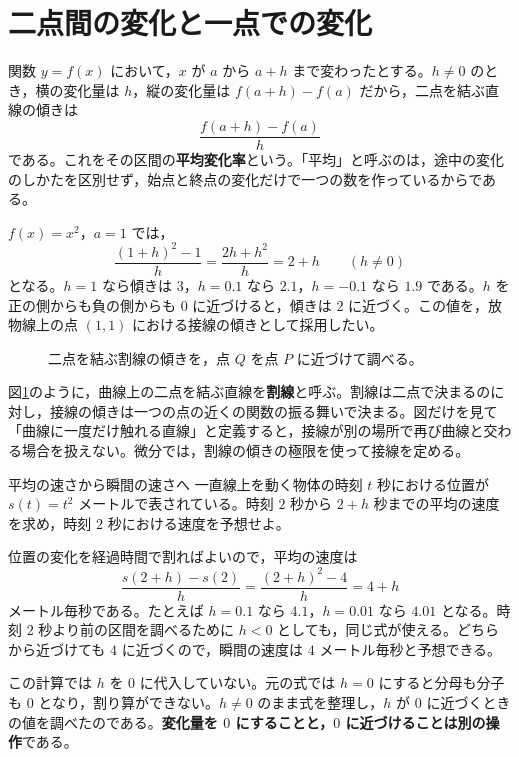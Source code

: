 \section{二点間の変化と一点での変化}\label{節:導入変化}
関数 $y=f(x)$ において，$x$ が $a$ から $a+h$ まで変わったとする。$h\ne0$ のとき，横の変化量は $h$，縦の変化量は $f(a+h)-f(a)$ だから，二点を結ぶ直線の傾きは
\[
 \frac{f(a+h)-f(a)}{h}
\]
である。これをその区間の\textbf{平均変化率}という。「平均」と呼ぶのは，途中の変化のしかたを区別せず，始点と終点の変化だけで一つの数を作っているからである。

$f(x)=x^2$，$a=1$ では，
\[
 \frac{(1+h)^2-1}{h}
 =\frac{2h+h^2}{h}=2+h \qquad(h\ne0)
\]
となる。$h=1$ なら傾きは $3$，$h=0.1$ なら $2.1$，$h=-0.1$ なら $1.9$ である。$h$ を正の側からも負の側からも $0$ に近づけると，傾きは $2$ に近づく。この値を，放物線上の点 $(1,1)$ における接線の傾きとして採用したい。

\begin{figure}[htbp]
\centering
{}
\caption{二点を結ぶ割線の傾きを，点 $Q$ を点 $P$ に近づけて調べる。}
\label{図:導入接線}
\end{figure}

図\ref{図:導入接線}のように，曲線上の二点を結ぶ直線を\textbf{割線}と呼ぶ。割線は二点で決まるのに対し，接線の傾きは一つの点の近くの関数の振る舞いで決まる。図だけを見て「曲線に一度だけ触れる直線」と定義すると，接線が別の場所で再び曲線と交わる場合を扱えない。微分では，割線の傾きの極限を使って接線を定める。

\begin{example}{平均の速さから瞬間の速さへ}
一直線上を動く物体の時刻 $t$ 秒における位置が $s(t)=t^2$ メートルで表されている。時刻 $2$ 秒から $2+h$ 秒までの平均の速度を求め，時刻 $2$ 秒における速度を予想せよ。
\end{example}
位置の変化を経過時間で割ればよいので，平均の速度は
\[
 \frac{s(2+h)-s(2)}{h}
 =\frac{(2+h)^2-4}{h}=4+h
\]
メートル毎秒である。たとえば $h=0.1$ なら $4.1$，$h=0.01$ なら $4.01$ となる。時刻 $2$ 秒より前の区間を調べるために $h<0$ としても，同じ式が使える。どちらから近づけても $4$ に近づくので，瞬間の速度は $4$ メートル毎秒と予想できる。

この計算では $h$ を $0$ に代入していない。元の式では $h=0$ にすると分母も分子も $0$ となり，割り算ができない。$h\ne0$ のまま式を整理し，$h$ が $0$ に近づくときの値を調べたのである。\textbf{変化量を $0$ にすることと，$0$ に近づけることは別の操作}である。

